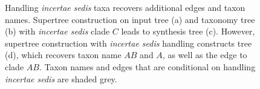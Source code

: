 \documentclass[english]{article}
\begin{document}
\begin{figure}
\hfill{}

\caption{\label{fig:Handling-incertae-sedis}Handling \emph{incertae sedis
}taxa recovers additional edges and taxon names.
Supertree construction
on input tree (a) and taxonomy tree (b) with \emph{incertae sedis}
clade $C$ leads to synthesis tree (c).
However, supertree construction
with \emph{incertae sedis} handling constructs tree (d), which recovers
taxon name $AB$ and $A$, as well as the edge to clade $AB$.
Taxon
names and edges that are conditional on handling \emph{incertae sedis}
are shaded grey.
}

\end{figure}
\end{document}
